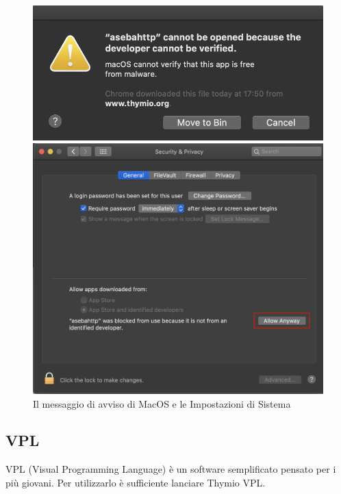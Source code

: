 \documentclass[12pt]{article}
\begin{document}
		\begin{figure}[H]
			\begin{minipage}{0.39\textwidth}
        				\centering
				\includegraphics[width=\textwidth]{img/macWarn1.png}
			\end{minipage}\hfill	
			\begin{minipage}{0.6\textwidth}
				\includegraphics[width=\textwidth]{img/macWarn2.png}
			\end{minipage}
			\caption{Il messaggio di avviso di MacOS e le Impostazioni di Sistema}
			\label{macErr}
		\end{figure}
		
	\subsection{VPL}
	
		VPL (Visual Programming Language) è un software semplificato pensato per i più giovani. Per utilizzarlo è sufficiente lanciare Thymio VPL.
		
\end{document}
